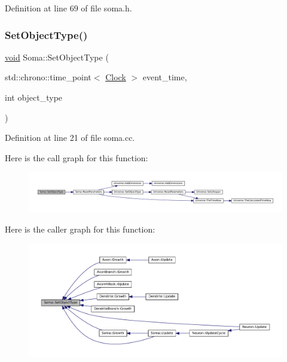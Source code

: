 Definition at line 69 of file soma.\+h.

\mbox{\label{class_soma_a85b4708eb51ab0962a6128b87aff0700}} 
\subsubsection{\texorpdfstring{Set\+Object\+Type()}{SetObjectType()}}
{\footnotesize\ttfamily \mbox{\hyperlink{glad_8h_a950fc91edb4504f62f1c577bf4727c29}{void}} Soma\+::\+Set\+Object\+Type (\begin{DoxyParamCaption}\item[{std\+::chrono\+::time\+\_\+point$<$ \mbox{\hyperlink{universe_8h_a0ef8d951d1ca5ab3cfaf7ab4c7a6fd80}{Clock}} $>$}]{event\+\_\+time,  }\item[{int}]{object\+\_\+type }\end{DoxyParamCaption})}



Definition at line 21 of file soma.\+cc.

Here is the call graph for this function\+:\nopagebreak
\begin{figure}[H]
\begin{center}
\leavevmode
\includegraphics[width=350pt]{class_soma_a85b4708eb51ab0962a6128b87aff0700_cgraph}
\end{center}
\end{figure}
Here is the caller graph for this function\+:\nopagebreak
\begin{figure}[H]
\begin{center}
\leavevmode
\includegraphics[width=350pt]{class_soma_a85b4708eb51ab0962a6128b87aff0700_icgraph}
\end{center}
\end{figure}
\mbox{\label{class_soma_a926552007228732d39525ce127ee5a0d}} 
